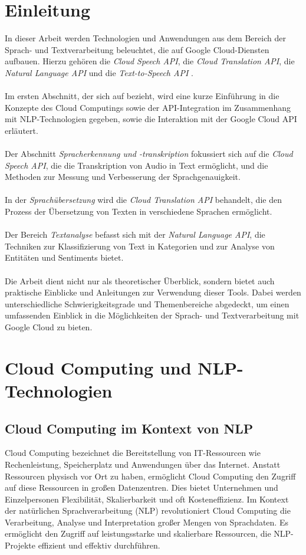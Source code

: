 \documentclass[12pt,a4paper]{article}
\begin{document}
\section*{Einleitung}
In dieser Arbeit werden Technologien und Anwendungen aus dem Bereich der Sprach- und Textverarbeitung beleuchtet, die auf Google Cloud-Diensten aufbauen. Hierzu gehören die \textit{Cloud Speech API}, die \textit{Cloud Translation API}, die \textit{Natural Language API} und die \textit{Text-to-Speech API} \cite{googlecloudskills2023}.
\\ \\
Im ersten Abschnitt, der sich auf \cite{giefers2023cloud} bezieht, wird eine kurze Einführung in die Konzepte des Cloud Computings sowie der API-Integration im Zusammenhang mit NLP-Technologien gegeben, sowie die Interaktion mit der Google Cloud API erläutert.
\\ \\
Der Abschnitt \textit{Spracherkennung und -transkription} fokussiert sich auf die \textit{Cloud Speech API}, die die Transkription von Audio in Text ermöglicht, und die Methoden zur Messung und Verbesserung der Sprachgenauigkeit.
\\ \\
In der \textit{Sprachübersetzung} wird die \textit{Cloud Translation API} behandelt, die den Prozess der Übersetzung von Texten in verschiedene Sprachen ermöglicht.
\\ \\
Der Bereich \textit{Textanalyse} befasst sich mit der \textit{Natural Language API}, die Techniken zur Klassifizierung von Text in Kategorien und zur Analyse von Entitäten und Sentiments bietet.
\\ \\
Die Arbeit dient nicht nur als theoretischer Überblick, sondern bietet auch praktische Einblicke und Anleitungen zur Verwendung dieser Tools. Dabei werden unterschiedliche Schwierigkeitsgrade und Themenbereiche abgedeckt, um einen umfassenden Einblick in die Möglichkeiten der Sprach- und Textverarbeitung mit Google Cloud zu bieten.

	
\newpage

\section{Cloud Computing und NLP-Technologien}

\subsection{Cloud Computing im Kontext von NLP}
Cloud Computing bezeichnet die Bereitstellung von IT-Ressourcen wie Rechenleistung, Speicherplatz und Anwendungen über das Internet. Anstatt Ressourcen physisch vor Ort zu haben, ermöglicht Cloud Computing den Zugriff auf diese Ressourcen in großen Datenzentren. Dies bietet Unternehmen und Einzelpersonen Flexibilität, Skalierbarkeit und oft Kosteneffizienz. Im Kontext der natürlichen Sprachverarbeitung (NLP) revolutioniert Cloud Computing die Verarbeitung, Analyse und Interpretation großer Mengen von Sprachdaten. Es ermöglicht den Zugriff auf leistungsstarke und skalierbare Ressourcen, die NLP-Projekte effizient und effektiv durchführen.
\end{document}
